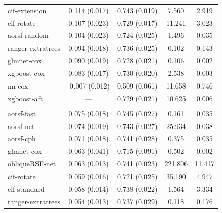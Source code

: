 \documentclass{article}\usepackage[]{graphicx}\usepackage[]{xcolor}
\newenvironment{knitrout}{}{} %
\begin{document}
\begin{knitrout}
\begin{longtable}[t]{lcccc}
\hspace{1em}cif-extension & 0.114 (0.017) & 0.743 (0.019) & 7.560 & 2.919\\
\hspace{1em}cif-rotate & 0.107 (0.023) & 0.729 (0.017) & 11.241 & 3.023\\
\hspace{1em}aorsf-random & 0.104 (0.023) & 0.724 (0.025) & 1.496 & 0.035\\
\hspace{1em}ranger-extratrees & 0.094 (0.018) & 0.736 (0.025) & 0.102 & 0.143\\
\hspace{1em}glmnet-cox & 0.090 (0.019) & 0.728 (0.021) & 0.106 & 0.002\\
\hspace{1em}xgboost-cox & 0.083 (0.017) & 0.730 (0.020) & 2.538 & 0.003\\
\hspace{1em}nn-cox & -0.007 (0.012) & 0.509 (0.061) & 11.658 & 0.746\\
\hspace{1em}xgboost-aft & --- & 0.729 (0.021) & 10.625 & 0.006\\
\addlinespace[0.3em]
\multicolumn{5}{l}{\textit{\textbf{GUIDE-IT; CVD death, n = 894, p = 59}}}\\
\hline
\hspace{1em}aorsf-fast & 0.075 (0.018) & 0.745 (0.027) & 0.161 & 0.035\\
\hspace{1em}aorsf-net & 0.074 (0.019) & 0.743 (0.027) & 25.934 & 0.038\\
\hspace{1em}aorsf-cph & 0.071 (0.018) & 0.741 (0.028) & 0.375 & 0.035\\
\hspace{1em}glmnet-cox & 0.063 (0.041) & 0.715 (0.091) & 0.502 & 0.002\\
\hspace{1em}obliqueRSF-net & 0.063 (0.013) & 0.741 (0.023) & 221.806 & 11.417\\
\hspace{1em}cif-rotate & 0.059 (0.016) & 0.721 (0.025) & 35.190 & 4.947\\
\hspace{1em}cif-standard & 0.058 (0.014) & 0.738 (0.022) & 1.564 & 3.334\\
\hspace{1em}ranger-extratrees & 0.054 (0.013) & 0.737 (0.029) & 0.118 & 0.176\\

\end{longtable}
\end{knitrout}
\end{document}
